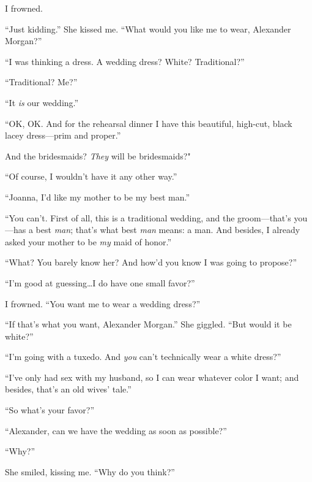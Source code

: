 I frowned.

``Just kidding.'' She kissed me. ``What would you like me to wear,
Alexander Morgan?''

``I was thinking a dress. A wedding dress? White? Traditional?''

``Traditional? Me?''

``It \emph{is} our wedding.''

``OK, OK. And for the rehearsal dinner I have this beautiful, high-cut,
black lacey dress---prim and proper.''

And the bridesmaids? \emph{They} will be bridesmaids?"

``Of course, I wouldn't have it any other way.''

``Joanna, I'd like my mother to be my best man.''

``You can't. First of all, this is a traditional wedding, and the
groom---that's you---has a best \emph{man}; that's what best \emph{man}
means: a man. And besides, I already asked your mother to be \emph{my}
maid of honor.''

``What? You barely know her? And how'd you know I was going to
propose?''

``I'm good at guessing\ldots I do have one small favor?''

I frowned. ``You want me to wear a wedding dress?''

``If that's what you want, Alexander Morgan.'' She giggled. ``But would
it be white?''

``I'm going with a tuxedo. And \emph{you} can't technically wear a white
dress?''

``I've only had sex with my husband, so I can wear whatever color I
want; and besides, that's an old wives' tale.''

``So what's your favor?''

``Alexander, can we have the wedding as soon as possible?''

``Why?''

She smiled, kissing me. ``Why do you think?''
